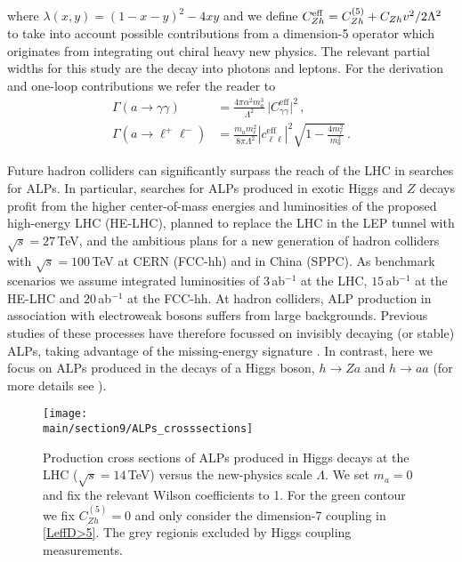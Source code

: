 %
where $\lambda(x,y)=(1-x-y)^2-4xy$ and we define $C_{Zh}^{\rm eff} = C_{Zh}^{(5)} + C_{Zh} v^2/2 \Lambda^2$ to take into account possible contributions from a dimension-5 operator which originates from integrating out chiral heavy new physics. The relevant partial widths for this study are the decay into photons and leptons. For the derivation and one-loop contributions we refer the reader to \cite{Bauer:2017ris}
%
\begin{align}
 \Gamma(a\to\gamma\gamma)  &= \frac{4\pi\alpha^2 m_a^3}{\Lambda^2}\,\big| C_{\gamma\gamma}^\text{eff} \big|^2 \,, \\
 \Gamma(a\to \ell^+ \ell^-)&=\frac{m_a m_\ell^2}{8\pi\Lambda^2} \left| c_{\ell\ell}^\text{eff}\right|^2 \sqrt{1-\frac{4m_\ell^2}{m_a^2}}\,.
\end{align}
%


Future hadron colliders can significantly surpass the reach of the LHC in searches for ALPs. In particular, searches for ALPs produced in exotic Higgs and $Z$ decays profit from the higher center-of-mass energies and luminosities of the proposed high-energy LHC (HE-LHC), planned to replace the LHC in the LEP tunnel with $\sqrt{s}=27 \,$TeV, and the ambitious plans for a new generation of hadron colliders with $\sqrt{s}=100\,$TeV at CERN (FCC-hh) and in China (SPPC). As benchmark scenarios we assume integrated luminosities of $3$\,ab$^{-1}$ at the LHC, $15$\,ab$^{-1}$ at the HE-LHC and $20$\,ab$^{-1}$ at the FCC-hh.
At hadron colliders, ALP production in association with electroweak bosons suffers from large backgrounds. Previous studies of these processes have therefore focussed on invisibly decaying (or stable) ALPs, taking advantage of the missing-energy signature \cite{Mimasu:2014nea,Brivio:2017ije}. In contrast, here we focus on ALPs produced in the decays of a Higgs boson, $h\to Za$ and $h \to a a$ (for more details see \cite{Bauer:2018uxu}).


%
\begin{figure}
\texttt{[image: \\main/section9/ALPs\_crosssections]}\caption{\label{fig:ALPpsec} Production cross sections of ALPs produced in Higgs decays at the LHC ($\sqrt{s} = 14\,$TeV) versus the new-physics scale $\Lambda$. We set $m_a=0$ and fix the relevant Wilson coefficients to 1. For the green contour we fix $C_{Zh}^{(5)}=0$ and only consider the dimension-7 coupling in \eqref{LeffD>5}.
The grey regionis excluded by Higgs coupling measurements. }
\end{figure}
%

